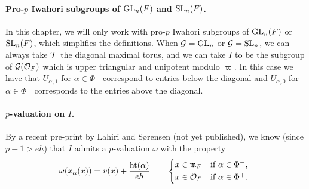 \paragraph{Pro-$p$ Iwahori subgroups of $\operatorname{GL}_{n}(F)$ and $\operatorname{SL}_{n}(F)$.} In this chapter, we will only work with pro-$p$ Iwahori subgroups of $\operatorname{GL}_{n}(F)$ or $\operatorname{SL}_{n}(F)$, which simplifies the definitions. When $\mathcal{G} = \operatorname{GL}_{n}$ or $\mathcal{G} = \operatorname{SL}_{n}$, we can always take $\mathcal{T}$ the diagonal maximal torus, and we can take $I$ to be the subgroup of $\mathcal{G}(\mathcal{O}_{F})$ which is upper triangular and unipotent modulo $\varpi$. In this case we have that $U_{\alpha,1}$ for $\alpha \in \Phi^{-}$ correspond to entries below the diagonal and $U_{\alpha,0}$ for $\alpha \in \Phi^{+}$ corresponds to the entries above the diagonal.

\paragraph{$p$-valuation on $I$.} By a recent pre-print by Lahiri and Sørensen (not yet published), we know (since $p-1 > eh$) that $I$ admits a $p$-valuation $\omega$ with the property
\begin{equation}\label{eq:Iwa-p-val}
  \omega(x_{\alpha}(x)) = v(x) + \frac{\Ht(\alpha)}{eh} \qquad
  \begin{dcases*}
    x \in \idm_{F} & if $\alpha \in \Phi^{-}$, \\
    x \in \sO_{F} & if $\alpha \in \Phi^{+}$.
  \end{dcases*}
\end{equation}

